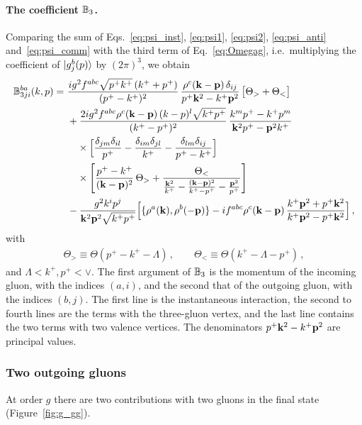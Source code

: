 \paragraph{The coefficient $\mathbb{B}_3$.} Comparing the sum of Eqs.~\eqref{eq:psi_inst}, \eqref{eq:psi1}, \eqref{eq:psi2}, \eqref{eq:psi_anti} and~\eqref{eq:psi_comm} with the third term of Eq.~\eqref{eq:Omegag}, i.e.\ multiplying the coefficient of $\ket{g^b_j(p)}$ by $(2\pi)^3$, we obtain
\begin{align}\label{eq:B3mom}
\mf B^{ba}_{3ji}(k,p)=\ &\frac{ig^2f^{abc}\sqrt{p^+k^+}\,(k^++p^+)}{(p^+-k^+)^2}\,\frac{\rho^c(\v k-\v p)\,\delta_{ij}}{p^+\v k^2-k^+\v p^2}\,\big[\Theta_>+\Theta_<\big]
\notag\\&
+\frac{2ig^2f^{abc}\rho^c(\v k-\v p)\,(k-p)^l\sqrt{k^+p^+}}{(k^+-p^+)^2}\,\frac{k^mp^+-k^+p^m}{\v k^2p^+-\v p^2k^+}
\notag\\&\quad\times\Big[\frac{\delta_{jm}\delta_{il}}{p^+}-\frac{\delta_{im}\delta_{jl}}{k^+}-\frac{\delta_{lm}\delta_{ij}}{p^+-k^+}\Big]
\notag\\&\quad\times
\Bigg[\frac{p^+-k^+}{(\v k-\v p)^2}\,\Theta_>+\frac{\Theta_<}{\frac{\v k^2}{k^+}-\frac{(\v k-\v p)^2}{k^+-p^+}-\frac{\v p^2}{p^+}}\Bigg]
\notag\\&
-\frac{g^2k^ip^j}{\v k^2\v p^2\sqrt{k^+p^+}}\Big[\{\rho^a(\v k),\rho^b(-\v p)\}-if^{abc}\rho^c(\v k-\v p)\,\frac{k^+\v p^2+p^+\v k^2}{k^+\v p^2-p^+\v k^2}\Big]\,,
\end{align}
with
\begin{align}
\Theta_>\equiv\Theta(p^+-k^+-\Lambda)\,,\qquad \Theta_<\equiv\Theta(k^+-\Lambda-p^+)\,,
\end{align}
and $\Lambda<k^+,p^+<\vee$. The first argument of $\mathbb{B}_3$ is the momentum of the incoming gluon, with the indices $(a,i)$, and the second that of the outgoing gluon, with the indices $(b,j)$. The first line is the instantaneous interaction, the second to fourth lines are the terms with the three-gluon vertex, and the last line contains the two terms with two valence vertices. The denominators $p^+\mathbf{k}^2-k^+\mathbf{p}^2$ are principal values.

\subsubsection{Two outgoing gluons}\label{sec:twoout}

At order $g$ there are two contributions with two gluons in the final state (Figure~\ref{fig:g_gg}).


